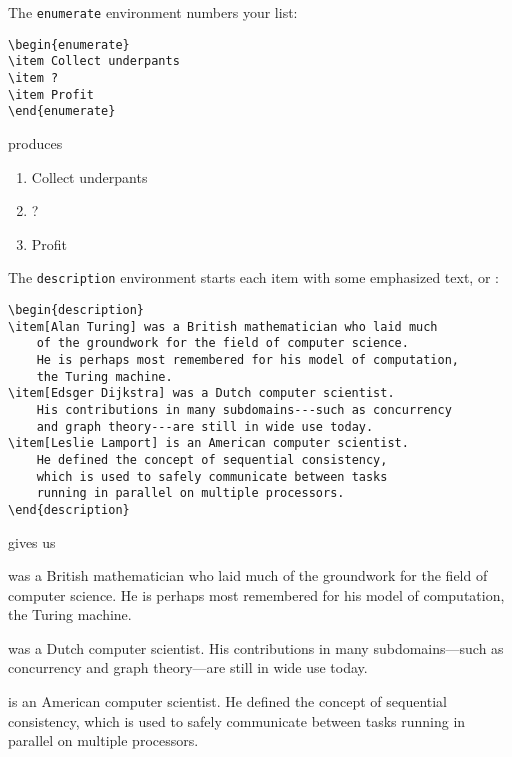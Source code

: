 \bigskip
\noindent The \texttt{enumerate} environment numbers your list:
\begin{leftfigure}
\begin{lstlisting}
\begin{enumerate}
\item Collect underpants
\item ?
\item Profit
\end{enumerate}
\end{lstlisting}
\end{leftfigure}
produces
\begin{leftfigure}
\lm%
\begin{enumerate}[leftmargin=*]
\item Collect underpants
\item ?
\item Profit
\end{enumerate}
\end{leftfigure}

\bigskip
\noindent The \texttt{description} environment starts each item with some
emphasized text, or :
\begin{leftfigure}
\begin{lstlisting}
\begin{description}
\item[Alan Turing] was a British mathematician who laid much
    of the groundwork for the field of computer science.
    He is perhaps most remembered for his model of computation,
    the Turing machine.
\item[Edsger Dijkstra] was a Dutch computer scientist.
    His contributions in many subdomains---such as concurrency
    and graph theory---are still in wide use today.
\item[Leslie Lamport] is an American computer scientist.
    He defined the concept of sequential consistency,
    which is used to safely communicate between tasks
    running in parallel on multiple processors.
\end{description}
\end{lstlisting}
\end{leftfigure}
gives us
\begin{leftfigure}
\lm%
\begin{minipage}{0.9\textwidth}
\begin{description}[leftmargin=*]
\item[\lm Alan Turing] was a British mathematician who laid much
    of the groundwork for the field of computer science.
    He is perhaps most remembered for his model of computation,
    the Turing machine.
\item[\lm Edsger Dijkstra] was a Dutch computer scientist.
    His contributions in many subdomains---such as concurrency
    and graph theory---are still in wide use today.
\item[\lm Leslie Lamport] is an American computer scientist.
    He defined the concept of sequential consistency,
    which is used to safely communicate between tasks
    running in parallel on multiple processors.
\end{description}
\end{minipage}
\end{leftfigure}

